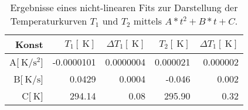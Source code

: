 
\begin{table}[!h]
\begin{center}
\begin{tabular}{|r|r|r|r|r|}
\hline
Konst & $T_\mathrm{1}[\SI{}{\kelvin}]$ & $\Delta T_\mathrm{1}[\SI{}{\kelvin}]$ & $T_\mathrm{2}[\SI{}{\kelvin}]$ & $\Delta T_\mathrm{1}[\SI{}{\kelvin}]$\\
\hline
\hline

A[$\SI{}{\kelvin\per\second^2}$] &	-0.0000101 &	 0.0000004 &	0.000021 &	0.000002\\
B[$\SI{}{\kelvin\per\second}$]   &	    0.0429 &	    0.0004 &	  -0.046 &	   0.002\\
C[$\SI{}{\kelvin}$]              &	    294.14 & 	      0.08 &	  295.90 &	    0.32\\

\hline
\end{tabular}
\caption[]{Ergebnisse eines nicht-linearen Fits zur Darstellung der Temperaturkurven $T_\mathrm{1}$ und $T_\mathrm{2}$ mittels $A*t^2+B*t+C$.}
\label{ergebnisse}
\end{center}
\end{table}
